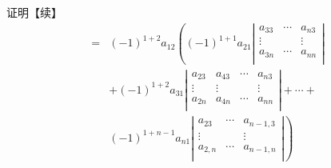 \begin{frame}
  \begin{block}{证明【续】}
    $$
    \begin{array}{ll}       
      = & (-1)^{1+2} a_{12} \left(
      (-1)^{1+1} a_{21} 
      \left|
      \begin{array}{ccc}       
        a_{33} & \cdots & a_{n3} \\
        \vdots  & & \vdots \\
        a_{3n} & \cdots & a_{nn} \\
      \end{array}
      \right|  \right.\\[0.4in]
      & \left.
      + (-1)^{1+2}a_{31} 
      \left|
      \begin{array}{cccc}
        a_{23}  & a_{43} & \cdots & a_{n3} \\
        \vdots & \vdots & & \vdots \\
        a_{2n}  & a_{4n} & \cdots & a_{nn} \\
      \end{array}
      \right| + \cdots + \right.\\[0.4in]
      & \left. (-1)^{1+n-1} a_{n1}
      \left|
      \begin{array}{ccc}
        a_{23} & \cdots & a_{n-1,3} \\
        \vdots & & \vdots \\
        a_{2,n} & \cdots & a_{n-1,n} \\
      \end{array}
      \right|
      \right)
    \end{array}
    $$
  \end{block}
\end{frame}

